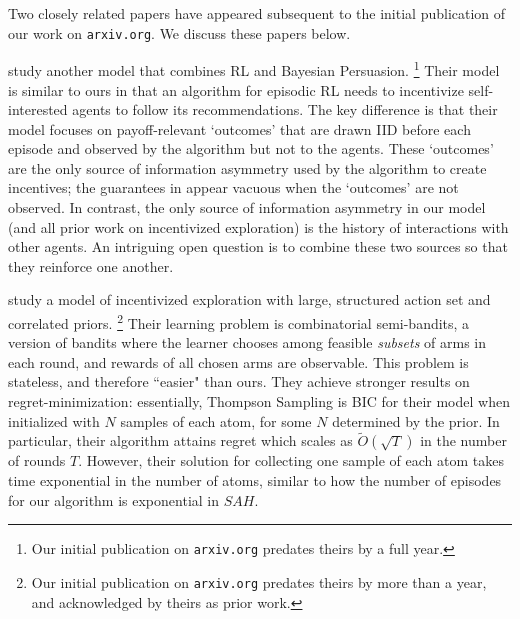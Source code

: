 Two closely related papers have appeared subsequent to the initial publication of our work on \texttt{arxiv.org}. We discuss these papers below.

\citet{IncentivizedRL-ec22} study another model that combines RL and Bayesian Persuasion.%
\footnote{Our initial publication on \texttt{arxiv.org} predates theirs by a full year.}
Their model is similar to ours in that an algorithm for episodic RL needs to incentivize self-interested agents to follow its recommendations. The key difference is that their model focuses on payoff-relevant `outcomes' that are drawn IID before each episode and observed by the algorithm but not to the agents. These `outcomes' are the only source of information asymmetry used by the algorithm to create incentives; the guarantees in \citep{IncentivizedRL-ec22} appear vacuous when the `outcomes' are not observed. In contrast, the only source of information asymmetry in our model (and all prior work on incentivized exploration) is the history of interactions with other agents. An intriguing open question is to combine these two sources so that they reinforce one another.

\citet{CombiIE-neurips22} study a model of incentivized exploration with large, structured action set and correlated priors.%
\footnote{Our initial publication on \texttt{arxiv.org} predates theirs by more than a year, and acknowledged by theirs as prior work.}
Their learning problem is combinatorial semi-bandits, a version of bandits where the learner chooses among feasible \emph{subsets} of arms in each round, and rewards of all chosen arms are observable. This problem is stateless, and therefore ``easier" than ours. They  achieve stronger results on regret-minimization: essentially, Thompson Sampling is BIC for their model when initialized with $N$ samples of each atom, for some $N$ determined by the prior. In particular, their algorithm attains regret which scales as $\tilde{O}(\sqrt{T})$ in the number of rounds $T$. However, their solution for collecting one sample of each atom takes time exponential in the number of atoms, similar to how the number of episodes for our algorithm is exponential in $SAH$.  